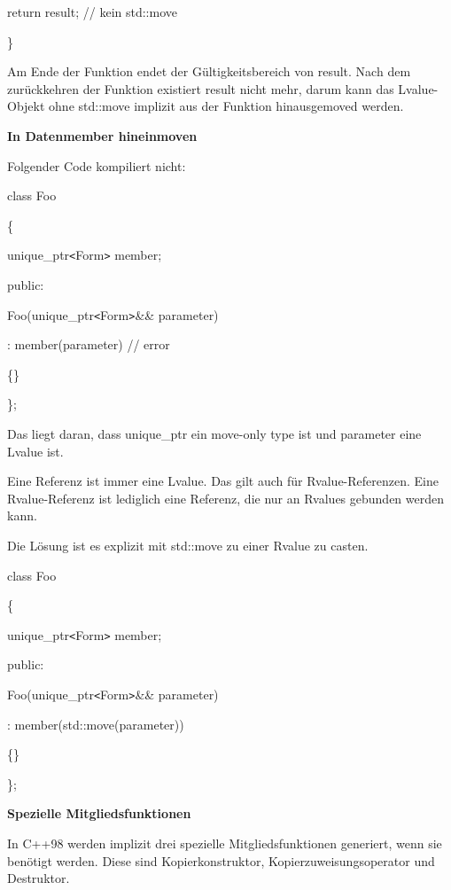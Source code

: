 \documentclass{article}
\begin{document}
return result;   // kein std::move

\parindent=0pt
\}

Am Ende der Funktion endet der Gültigkeitsbereich von result. Nach dem zurückkehren 
der Funktion existiert result nicht mehr, darum kann das Lvalue-Objekt ohne std::move 
implizit aus der Funktion hinausgemoved werden.

\vspace{12pt}
\textbf{In Datenmember hineinmoven}

Folgender Code kompiliert nicht:

class Foo

\{    

\parindent=14pt
unique\_ptr\texttt{<}Form\texttt{>} member;

\vspace{12pt}
\parindent=0pt
public:    

\parindent=14pt
Foo(unique\_ptr\texttt{<}Form\texttt{>}\&\& parameter)    

: member(parameter)   // error    

\parindent=28pt
\{\}

\parindent=0pt
\};

Das liegt daran, dass unique\_ptr ein move-only type ist und parameter eine Lvalue 
ist.

Eine Referenz ist immer eine Lvalue. Das gilt auch für Rvalue-Referenzen. Eine 
Rvalue-Referenz ist lediglich eine Referenz, die nur an Rvalues gebunden werden 
kann.

Die Lösung ist es explizit mit std::move zu einer Rvalue zu casten.

class Foo

\{    

\parindent=14pt
unique\_ptr\texttt{<}Form\texttt{>} member;

\vspace{12pt}
\parindent=0pt
public:    

\parindent=14pt
Foo(unique\_ptr\texttt{<}Form\texttt{>}\&\& parameter)    

: member(std::move(parameter))    

\{\}

\};

\vspace{12pt}
\parindent=0pt
\textbf{Spezielle Mitgliedsfunktionen}

In C++98 werden implizit drei spezielle Mitgliedsfunktionen generiert, wenn sie 
benötigt werden. Diese sind Kopierkonstruktor, Kopierzuweisungsoperator und Destruktor.
\end{document}
